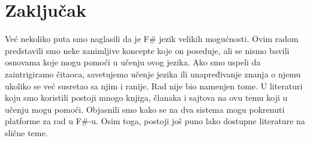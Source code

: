 \documentclass[a4paper]{article}
\begin{document}
\section{Zaključak}
\label{sec:zakljucak}

Već nekoliko puta smo naglasili da je F\# jezik velikih mogućnosti. Ovim radom predstavili smo neke zanimljive koncepte koje on poseduje, ali se nismo bavili osnovama koje mogu pomoći u učenju ovog jezika. Ako smo uspeli da zaintrigiramo čitaoca, savetujemo učenje jezika ili unapređivanje znanja o njemu ukoliko se već susretao sa njim i ranije. Rad nije bio namenjen tome. U literaturi koju smo koristili postoji mnogo knjiga, članaka i sajtova na ovu temu koji u učenju mogu pomoći. Objasnili smo kako se na dva sistema mogu pokrenuti platforme za rad u F\#-u. Osim toga, postoji još puno lako dostupne literature na slične teme.

\appendix
 

\end{document}
